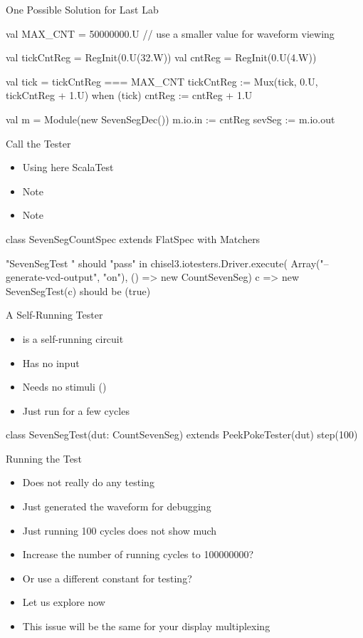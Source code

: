 \begin{frame}[fragile]{One Possible Solution for Last Lab}
\begin{chisel}
  val MAX_CNT = 50000000.U // use a smaller value for waveform viewing
  
  val tickCntReg = RegInit(0.U(32.W))
  val cntReg = RegInit(0.U(4.W))
  
  val tick = tickCntReg === MAX_CNT
  tickCntReg := Mux(tick, 0.U, tickCntReg + 1.U)
  when (tick) {
    cntReg := cntReg + 1.U
  }
  
  val m = Module(new SevenSegDec())
  m.io.in := cntReg
  sevSeg := m.io.out
\end{chisel}
\end{frame}

\begin{frame}[fragile]{Call the Tester}
\begin{itemize}
\item Using here ScalaTest
\item Note 
\item Note 
\end{itemize}
\begin{chisel}
class SevenSegCountSpec extends
  FlatSpec with Matchers {
  
  "SevenSegTest " should "pass" in {
      chisel3.iotesters.Driver.execute(
      Array("--generate-vcd-output", "on"),
      () => new CountSevenSeg)
        { c => new SevenSegTest(c)}
        should be (true)
	}
}
\end{chisel}
\end{frame}

\begin{frame}[fragile]{A Self-Running Tester}
\begin{itemize}
\item {} is a self-running circuit
\item Has no input
\item Needs no stimuli ()
\item Just run for a few cycles
\end{itemize}
\begin{chisel}
class SevenSegTest(dut: CountSevenSeg) extends PeekPokeTester(dut) {
  step(100)
}
\end{chisel}
\end{frame}

\begin{frame}[fragile]{Running the Test}
\begin{itemize}
\item Does not really do any testing
\item Just generated the waveform for debugging
\item Just running 100 cycles does not show much
\item Increase the number of running cycles to 100000000?
\item Or use a different constant for testing?
\item Let us explore now
\item This issue will be the same for your display multiplexing
\end{itemize}
\end{frame}


